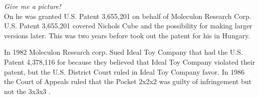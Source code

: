 \textit{Give me a picture!} \\

On  he was granted U.S. Patent 3,655,201 on behalf of Moleculon Research Corp. U.S. Patent 3,655,201 covered Nichols Cube and the possibility for making larger versions later. This was two years before \erno{} took out the patent for his \rubik{} in Hungary. 

In 1982 Moleculon Research corp.  Sued Ideal Toy Company that had the U.S. Patent 4,378,116 for \rubik{} because they believed that Ideal Toy Company violated their patent, but the U.S. District Court ruled in Ideal Toy Company favor. In 1986 the Court of Appeals ruled that the Pocket \rubik{} 2x2x2 was guilty of infringement but not the 3x3x3 \rubik{}.

%